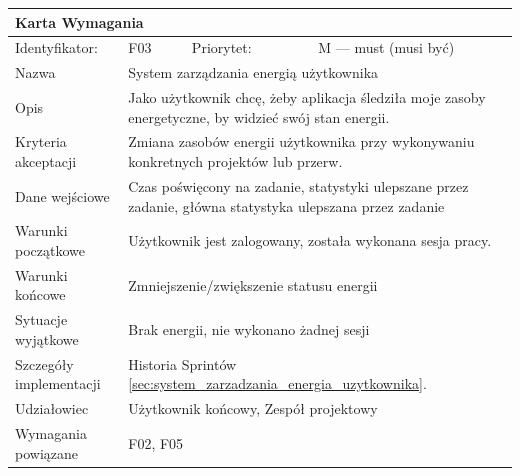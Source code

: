 \documentclass[a4paper,11pt]{report}
\begin{document}
		\begin{tabular}{|p{3cm}|p{2cm}|p{2cm}|p{6cm}|}
		\hline
		\multicolumn{4}{|p{12 cm}|}{Karta Wymagania}\\
		\hline
		Identyfikator: & F03 & Priorytet: & M — must (musi być)\\
		\hline
		Nazwa & \multicolumn{3}{|p{10 cm}|}{System zarządzania energią użytkownika}\\
		\hline
		Opis & \multicolumn{3}{|p{10 cm}|}{Jako użytkownik chcę, żeby aplikacja śledziła moje zasoby energetyczne, by widzieć swój stan energii.}\\
		\hline
		Kryteria akceptacji & \multicolumn{3}{|p{10 cm}|}{Zmiana zasobów energii użytkownika przy wykonywaniu konkretnych projektów lub przerw.}\\
		\hline
		Dane wejściowe & \multicolumn{3}{|p{10 cm}|}{Czas poświęcony na zadanie, statystyki ulepszane przez zadanie, główna statystyka ulepszana przez zadanie}\\
		\hline
		Warunki początkowe & \multicolumn{3}{|p{10 cm}|}{Użytkownik jest zalogowany, została wykonana sesja pracy.}\\
		\hline
		Warunki końcowe & \multicolumn{3}{|p{10 cm}|}{Zmniejszenie/zwiększenie statusu energii}\\
		\hline
		Sytuacje wyjątkowe & \multicolumn{3}{|p{10 cm}|}{Brak energii, nie wykonano żadnej sesji}\\
		\hline
		Szczegóły implementacji & \multicolumn{3}{|p{10 cm}|}{Historia Sprintów \ref{sec:system_zarzadzania_energia_uzytkownika}.}\\
		\hline
		Udziałowiec & \multicolumn{3}{|p{10 cm}|}{Użytkownik końcowy, Zespół projektowy}\\
		\hline
		Wymagania powiązane & \multicolumn{3}{|p{10 cm}|}{F02, F05}\\
		\hline
		\end{tabular}\\
		\newline
		\vspace*{0,2 cm}
		\newline
\end{document}
